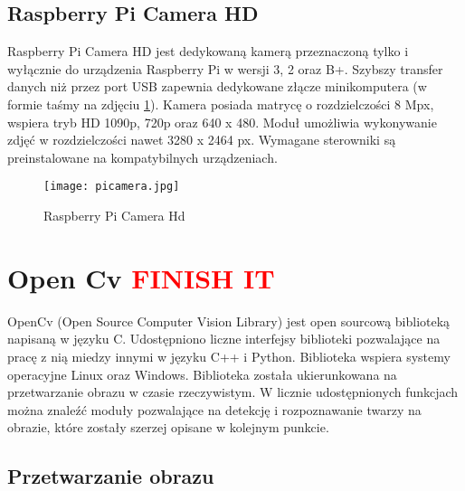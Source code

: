 \subsection{Raspberry Pi Camera HD}
Raspberry Pi Camera HD jest dedykowaną kamerą przeznaczoną tylko i wyłącznie do urządzenia Raspberry Pi w wersji 3, 2 oraz B+. Szybszy transfer danych niż przez port USB zapewnia dedykowane złącze minikomputera (w formie taśmy na zdjęciu \ref{fig:picamera}). Kamera posiada matrycę o rozdzielczości 8 Mpx, wspiera tryb HD 1090p, 720p oraz 640 x 480. Moduł umożliwia wykonywanie zdjęć w rozdzielczości nawet 3280 x 2464 px. Wymagane sterowniki są preinstalowane na kompatybilnych urządzeniach.
\begin{figure}[H]
	\centering
	\texttt{[image: picamera.jpg]}
	\caption{Raspberry Pi Camera Hd}
	\label{fig:picamera}
\end{figure}

\section{Open Cv  \textcolor{red}{FINISH IT}}
OpenCv (Open Source Computer Vision Library) jest open sourcową biblioteką napisaną w języku C. Udostępniono liczne interfejsy biblioteki pozwalające na pracę z nią miedzy innymi w języku C++ i Python. Biblioteka wspiera systemy operacyjne Linux oraz Windows. Biblioteka została ukierunkowana na przetwarzanie obrazu w czasie rzeczywistym. W licznie udostępnionych funkcjach można znaleźć moduły pozwalające na detekcję i rozpoznawanie twarzy na obrazie, które zostały szerzej opisane w kolejnym punkcie.

\subsection{Przetwarzanie obrazu}

